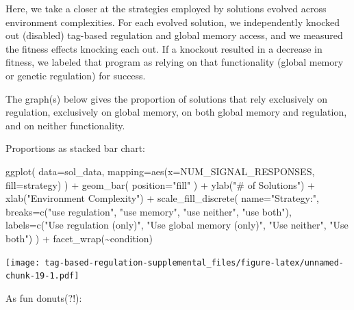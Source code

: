 \documentclass[
]{book}
\newenvironment{Shaded}{\begin{snugshade}}{\end{snugshade}}
\newcommand{\AttributeTok}[1]{\textcolor[rgb]{0.77,0.63,0.00}{#1}}
\newcommand{\FunctionTok}[1]{\textcolor[rgb]{0.00,0.00,0.00}{#1}}
\newcommand{\NormalTok}[1]{#1}
\newcommand{\SpecialCharTok}[1]{\textcolor[rgb]{0.00,0.00,0.00}{#1}}
\newcommand{\StringTok}[1]{\textcolor[rgb]{0.31,0.60,0.02}{#1}}
\begin{document}
Here, we take a closer at the strategies employed by solutions evolved across environment complexities.
For each evolved solution, we independently knocked out (disabled) tag-based regulation and global memory access, and we measured the fitness effects knocking each out.
If a knockout resulted in a decrease in fitness, we labeled that program as relying on that functionality (global memory or genetic regulation) for success.

The graph(s) below gives the proportion of solutions that rely exclusively on regulation, exclusively on global memory, on both global memory and regulation, and on neither functionality.

Proportions as stacked bar chart:

\begin{Shaded}
\begin{Highlighting}[]
\FunctionTok{ggplot}\NormalTok{( }\AttributeTok{data=}\NormalTok{sol\_data, }\AttributeTok{mapping=}\FunctionTok{aes}\NormalTok{(}\AttributeTok{x=}\NormalTok{NUM\_SIGNAL\_RESPONSES, }\AttributeTok{fill=}\NormalTok{strategy) ) }\SpecialCharTok{+}
  \FunctionTok{geom\_bar}\NormalTok{(}
    \AttributeTok{position=}\StringTok{"fill"}
\NormalTok{  ) }\SpecialCharTok{+}
  \FunctionTok{ylab}\NormalTok{(}\StringTok{"\# of Solutions"}\NormalTok{) }\SpecialCharTok{+}
  \FunctionTok{xlab}\NormalTok{(}\StringTok{"Environment Complexity"}\NormalTok{) }\SpecialCharTok{+}
  \FunctionTok{scale\_fill\_discrete}\NormalTok{(}
    \AttributeTok{name=}\StringTok{"Strategy:"}\NormalTok{,}
    \AttributeTok{breaks=}\FunctionTok{c}\NormalTok{(}\StringTok{"use regulation"}\NormalTok{,}
             \StringTok{"use memory"}\NormalTok{,}
             \StringTok{"use neither"}\NormalTok{,}
             \StringTok{"use both"}\NormalTok{),}
    \AttributeTok{labels=}\FunctionTok{c}\NormalTok{(}\StringTok{"Use regulation (only)"}\NormalTok{,}
             \StringTok{"Use global memory (only)"}\NormalTok{,}
             \StringTok{"Use neither"}\NormalTok{,}
             \StringTok{"Use both"}\NormalTok{)}
\NormalTok{    ) }\SpecialCharTok{+}
  \FunctionTok{facet\_wrap}\NormalTok{(}\SpecialCharTok{\textasciitilde{}}\NormalTok{condition)}
\end{Highlighting}
\end{Shaded}

\texttt{[image: tag-based-regulation-supplemental\_files/figure-latex/unnamed-chunk-19-1.pdf]}

As fun donuts(?!):
\end{document}
